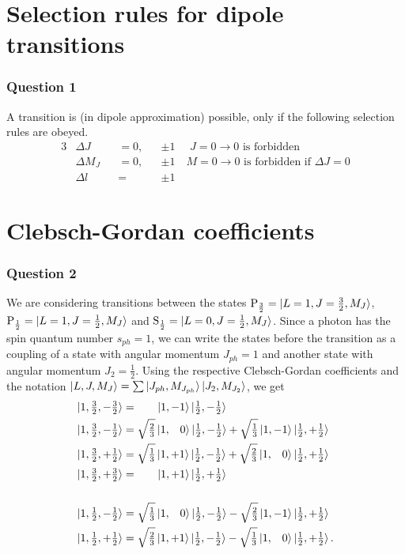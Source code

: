 \section{Selection rules for dipole transitions}  
\subsubsection{Question 1}
A transition is (in dipole approximation) possible, only if the following selection rules are obeyed.\cite[Tab.~7.2]{demtröderEP3}
\begin{alignat}{3}
	&\Delta J&&=0,&&\pm1 \quad \,\,\text{$J=0\to 0$ is forbidden}\\
	&\Delta M_J&&=0,&&\pm1 \quad \text{$M=0\to 0$ is forbidden if $\Delta J=0$}\\
	&\Delta l &&= &&\pm1
\end{alignat}
\section{Clebsch-Gordan coefficients}
\subsubsection{Question 2}
We are considering transitions between the states $\mathrm P_\frac{3}{2}=\ket{L=1,J=\frac{3}{2}, M_J}$, $\mathrm P_\frac{1}{2}=\ket{L=1,J=\frac{1}{2}, M_J}$ and $\mathrm S_\frac{1}{2}=\ket{L=0,J=\frac{1}{2}, M_J}$. 
Since a photon has the spin quantum number $s_{ph}=1$, we can write the states before the transition as a coupling of a state with angular momentum $J_{ph}=1$ and another state with angular momentum $J_2=\frac{1}{2}$. 
Using the respective Clebsch-Gordan coefficients and the notation $\ket{L,J,M_J}=\sum\ket{J_{ph},M_{J_{ph}}}\ket{J_2,M_{J_2}}$, we get \cite[Tab.~4.8]{griffithsQM}
\begin{align}
	\ket{1,\tfrac{3}{2},-\tfrac{3}{2}}&=\quad \;\;\; \ket{1,-1}\ket{\tfrac{1}{2},-\tfrac{1}{2}}\\
	\ket{1,\tfrac{3}{2},-\tfrac{1}{2}}&=\sqrt{\tfrac{2}{3}}\ket{1,\;\;\;0}\ket{\tfrac{1}{2},-\tfrac{1}{2}}+\sqrt{\tfrac{1}{3}}\ket{1,-1}\ket{\tfrac{1}{2},+\tfrac{1}{2}}\\
	\ket{1,\tfrac{3}{2},+\tfrac{1}{2}}&=\sqrt{\tfrac{1}{3}}\ket{1,+1}\ket{\tfrac{1}{2},-\tfrac{1}{2}}+\sqrt{\tfrac{2}{3}}\ket{1,\;\;\; 0}\ket{\tfrac{1}{2},+\tfrac{1}{2}}\\
	\ket{1,\tfrac{3}{2},+\tfrac{3}{2}}&=\quad \;\;\; \ket{1,+1}\ket{\tfrac{1}{2},+\tfrac{1}{2}}\\
	\nonumber\\
	\ket{1,\tfrac{1}{2},-\tfrac{1}{2}}&=\sqrt{\tfrac{1}{3}}\ket{1,\;\;\;0}\ket{\tfrac{1}{2},-\tfrac{1}{2}}-\sqrt{\tfrac{2}{3}}\ket{1,-1}\ket{\tfrac{1}{2},+\tfrac{1}{2}}\\
	\ket{1,\tfrac{1}{2},+\tfrac{1}{2}}&=\sqrt{\tfrac{2}{3}}\ket{1,+1}\ket{\tfrac{1}{2},-\tfrac{1}{2}}-\sqrt{\tfrac{1}{3}}\ket{1,\;\;\; 0}\ket{\tfrac{1}{2},+\tfrac{1}{2}}.
\end{align}
